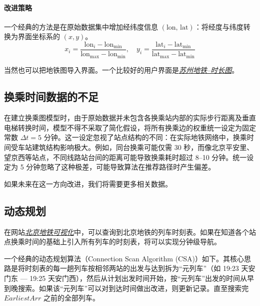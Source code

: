 	\paragraph{改进策略}
	一个经典的方法是在原始数据集中增加经纬度信息 $(\text{lon, lat})$：将经度与纬度转换为界面坐标系的 $(x, y)$。$$x_i = \frac{\text{lon}_i - \text{lon}_{\min}}{\text{lon}_{\max} - \text{lon}_{\min}}, \quad y_i = \frac{\text{lat}_i - \text{lat}_{\min}}{\text{lat}_{\max} - \text{lat}_{\min}}$$
	
	当然也可以把地铁图导入界面。一个比较好的用户界面是\href{https://www.sz-mtr.com/service/guide/map/index_zh.html?T}{\textit{苏州地铁--时长图}}。
	
	\subsection{换乘时间数据的不足}
	
	在建立换乘图模型时，由于原始数据并未包含各换乘站内部的实际步行距离及垂直电梯转换时间，模型不得不采取了简化假设，将所有换乘边的权重统一设定为固定常数 $\Delta t = 5$ 分钟。这一设定忽视了站点结构的不同：在实际地铁网络中，换乘时间受车站建筑结构影响极大。例如，同台换乘可能仅需 30 秒，而像北京平安里、望京西等站点，不同线路站台间的距离可能导致换乘耗时超过 8--10 分钟。统一设定为 5 分钟忽略了这种极差，可能导致算法在推荐路径时产生偏差。
	
	如果未来在这一方向改进，我们将需要更多相关数据。
	
	\subsection{动态规划}
	在网站\href{https://bjsubway.boyinthesun.cn/}{\textit{北京地铁可视化}}中，可以查询到北京地铁的列车时刻表。如果在知道各个站点换乘时间的基础上引入所有列车的时刻表，将可以实现分钟级导航。
	
	一个经典的动态规划算法（Connection Scan Algorithm (CSA)）如下。其核心思路是将时刻表的每一趟列车按相邻两站的出发与达到拆为“元列车”（如 19:23 天安门东 --- 19:25 天安门西），然后从计划出发时间开始，按“元列车”出发的时间从早到晚搜索。如果该“元列车”可以对到达时间做出改进，则更新记录。直至搜索完 $EarliestArr$ 之前的全部列车。
	
